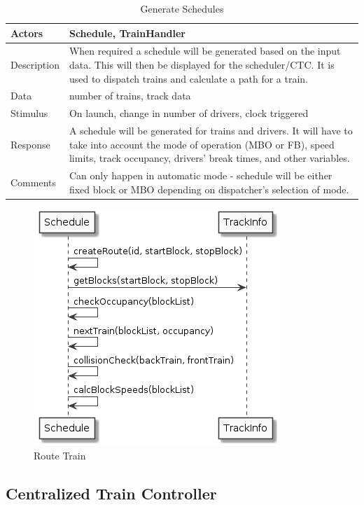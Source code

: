 \documentclass[]{article}
\begin{document}
	\begin{table}[H]
		\centering
		\caption{Generate Schedules}
		\begin{tabular}{|l|l|}
			\hline
			Actors & \parbox[t]{10cm}{Schedule, TrainHandler} \\ \hline
			Description & \parbox[t]{10cm}{When required a schedule will be generated based on the input data. This will then be displayed for the scheduler/CTC. It is used to dispatch trains and calculate a path for a train.} \\ \hline
			Data &  \parbox[t]{10cm}{number of trains, track data} \\ \hline
			Stimulus &  \parbox[t]{10cm}{On launch, change in number of drivers, clock triggered} \\ \hline
			Response & \parbox[t]{10cm}{A schedule will be generated for trains and drivers. It will have to take into account the mode of operation (MBO or FB), speed limits, track occupancy, drivers’ break times, and other variables.}\\ \hline
			Comments & \parbox[t]{10cm}{Can only happen in automatic mode - schedule will be either fixed block or MBO depending on dispatcher's selection of mode.}  \\ \hline
		\end{tabular}
	\end{table}
	
	\begin{figure}[H]
		\centering
		\includegraphics{routeTrain.png}
		\caption{Route Train}
	\end{figure}
	
\subsection{Centralized Train Controller}
\end{document}
